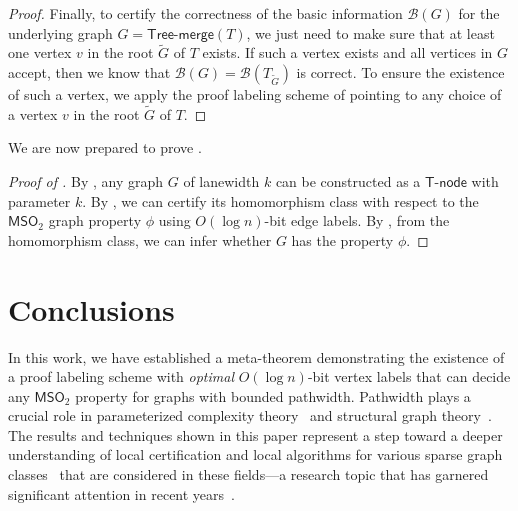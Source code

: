 \documentclass[11pt]{article}
\theoremstyle{definition}
\theoremstyle{remark}
\newcommand{\MSO}{\mathsf{MSO}_2}
\newcommand{\tmerge}{\mathsf{Tree}\text{-}\mathsf{merge}}
\newcommand{\tnode}{\mathsf{T}\text{-}\mathsf{node}}
\begin{document}
\begin{proof}
 Finally, to certify the correctness of the basic information $\mathcal{B}(G)$ for the underlying graph $G = \tmerge(T)$, we just need to make sure that at least one vertex $v$ in the root $\tilde{G}$ of $T$ exists. If such a vertex exists and all vertices in $G$ accept, then we know that $\mathcal{B}(G) = \mathcal{B}(T_{\tilde{G}})$ is correct. To ensure the existence of such a vertex, we apply the proof labeling scheme of  pointing to any choice of a vertex $v$ in the root $\tilde{G}$ of $T$.
\end{proof}

We are now prepared to prove .

\begin{proof}[Proof of ]
By , any graph $G$ of lanewidth $k$ can be constructed as a $\tnode$ with parameter $k$. By , we can certify its homomorphism class with respect to the $\MSO$ graph property $\phi$ using $O(\log n)$-bit edge labels. By , from the homomorphism class, we can infer whether $G$ has the property $\phi$.
\end{proof}

\section{Conclusions}\label{sect:conclusion}
In this work, we have established a meta-theorem demonstrating the existence of a proof labeling scheme with \emph{optimal} $O(\log n)$-bit vertex labels that can decide any $\MSO$ property for graphs with bounded pathwidth. Pathwidth plays a crucial role in parameterized complexity theory~\cite{downey27082016} and structural graph theory~\cite{kawarabayashi2007some,lovasz2006graph}. The results and techniques shown in this paper represent a step toward a deeper understanding of local certification and local algorithms for various sparse graph classes~\cite{nevsetvril2012sparsity} that are considered in these fields---a research topic that has garnered significant attention in recent years~\cite{bousquet2024local,ESPERET202268,esperet_et_al:LIPIcs.ICALP.2022.58,feuilloley2022can,feuilloley2021compact,feuilloley2023local,fomin2024distributed,fraigniaud2024meta,naor2020power,nevsetvril2016distributed}.
\end{document}
